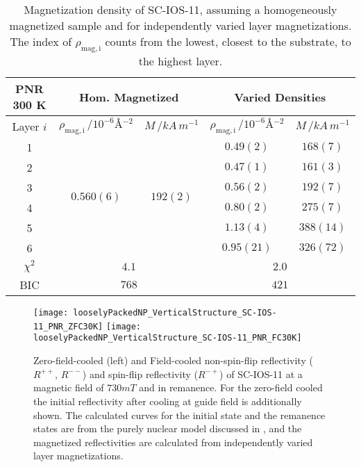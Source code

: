 \documentclass[\main/dresen_thesis.tex]{subfiles}
\begin{document}
  \begin{table}[!htbp]
    \centering
    \caption{\label{tab:looselyPackedNP:layers:pnrSCIOS300K500mT}Magnetization density of SC-IOS-11, assuming a homogeneously magnetized sample and for independently varied layer magnetizations. The index of $\rho_\mathrm{mag, i}$ counts from the lowest, closest to the substrate, to the highest layer.}
    \begin{tabular}{ c | c | c | c | c}
      \rule{0pt}{2ex} \textbf{PNR \@ 300 K}  & \multicolumn{2}{c}{Hom. Magnetized} & \multicolumn{2}{c}{Varied Densities} \\
      \hline
      Layer $i$ & $\rho_\mathrm{mag, i} \, / \unit{10^{-6} \angstrom^{-2}}$ & $M \, / \unit{kA \, m^{-1}}$ & $\rho_\mathrm{mag, i} \, / \unit{10^{-6} \angstrom^{-2}}$ & $M \, / \unit{kA \, m^{-1}}$\\
      \hline
      1         & \multirow{6}{*}{$0.560(6)$} & \multirow{6}{*}{$192(2)$}   & $0.49(2)$ & $168(7)$\\
      2         &                             &                             & $0.47(1)$ & $161(3)$\\
      3         &                             &                             & $0.56(2)$ & $192(7)$\\
      4         &                             &                             & $0.80(2)$ & $275(7)$\\
      5         &                             &                             & $1.13(4)$ & $388(14)$\\
      6         &                             &                             & $0.95(21)$& $326(72)$\\
      \hline
      $\chi^2$  & \multicolumn{2}{c}{$4.1$}   & \multicolumn{2}{c}{$2.0$}\\
      BIC       & \multicolumn{2}{c}{$768$}   & \multicolumn{2}{c}{$421$}\\
      \hline
    \end{tabular}
  \end{table}

  \begin{figure}[tb]
    \centering
    \texttt{[image: looselyPackedNP\_VerticalStructure\_SC-IOS-11\_PNR\_ZFC30K]}
    \texttt{[image: looselyPackedNP\_VerticalStructure\_SC-IOS-11\_PNR\_FC30K]}
    \caption{\label{fig:looselyPackedNP:layer:pnrZFCFCIOS11}Zero-field-cooled (left) and Field-cooled non-spin-flip reflectivity ($R^{++},\,R^{--}$) and spin-flip reflectivity ($R^{-+}$) of SC-IOS-11 at a magnetic field of $730 \unit{mT}$ and in remanence. For the zero-field cooled the initial reflectivity after cooling at guide field is additionally shown. The calculated curves for the initial state and the remanence states are from the purely nuclear model discussed in , and the magnetized reflectivities are calculated from independently varied layer magnetizations.}
  \end{figure}
\end{document}
